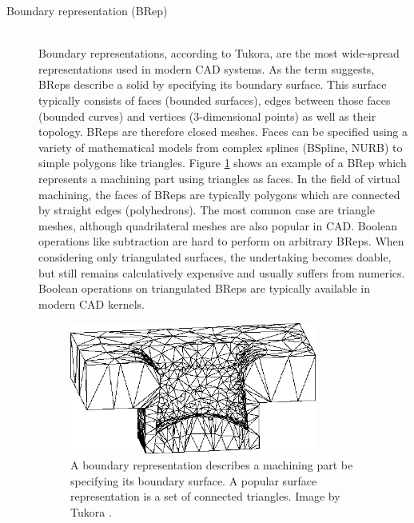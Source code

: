 \begin{description}
	\item[Boundary representation (BRep)] \hfill \\
	Boundary representations, according to Tukora, are the most wide-spread representations used in modern CAD systems.
	As the term suggests, BReps describe a solid by specifying its boundary surface.
	This surface typically consists of faces (bounded surfaces), edges between those faces (bounded curves) and vertices (3-dimensional points) as well as their topology.
	BReps are therefore closed meshes.
	Faces can be specified using a variety of mathematical models from complex splines (BSpline, NURB) to simple polygons like triangles.
	Figure \ref{fig:brep} shows an example of a BRep which represents a machining part using triangles as faces.
	In the field of virtual machining, the faces of BReps are typically polygons which are connected by straight edges (\ie polyhedrons).
	The most common case are triangle meshes, although quadrilateral meshes are also popular in CAD.
	Boolean operations like subtraction are hard to perform on arbitrary BReps.
	When considering only triangulated surfaces, the undertaking becomes doable, but still remains calculatively expensive and usually suffers from numerics.
	Boolean operations on triangulated BReps are typically available in modern CAD kernels.
	
	\begin{figure}[H]
		\centering
		\includegraphics[width=0.8\textwidth]{images/brep}
		\caption{
			A boundary representation describes a machining part be specifying its boundary surface. A popular surface representation is a set of connected triangles. 
			Image by Tukora \cite{virtual_machining_review}. 
		}
		\label{fig:brep}
	\end{figure}
	

\end{description}
